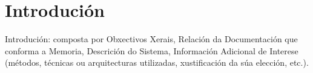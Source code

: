 \chapter{Introdución}

Introdución: composta por Obxectivos Xerais, Relación da Documentación que conforma a Memoria, Descrición do Sistema, Información Adicional de Interese (métodos, técnicas ou arquitecturas utilizadas, xustificación da súa elección, etc.).
